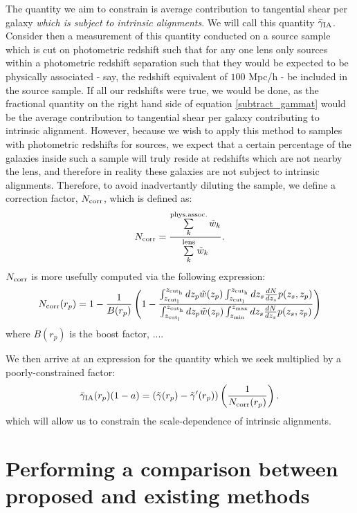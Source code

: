 \documentclass[a4paper,fleqn,usenatbib]{mnras}
\begin{document}
The quantity we aim to constrain is average contribution to tangential shear per galaxy {\it which is subject to intrinsic alignments}. We will call this quantity $\bar{\gamma}_{\rm IA}$. Consider then a measurement of this quantity conducted on a source sample which is cut on photometric redshift such that for any one lens only sources within a photometric redshift separation such that they would be expected to be physically associated - say, the redshift equivalent of $100$ Mpc/h - be included in the source sample. If all our redshifts were true, we would be done, as the fractional quantity on the right hand side of equation \ref{subtract_gammat} would be the average contribution to tangential shear per galaxy contributing to intrinsic alignment. However, because we wish to apply this method to samples with photometric redshifts for sources, we expect that a certain percentage of the galaxies inside such a sample will truly reside at redshifts which are not nearby the lens, and therefore in reality these galaxies are not subject to intrinsic alignments. Therefore, to avoid inadvertantly diluting the sample, we define a correction factor, $N_{\rm corr}$, which is defined as:
\begin{equation}
N_{\rm corr} = \frac{\sum\limits_{k}^{\rm phys. assoc.} \tilde{w}_k}{\sum\limits_{k}^{\rm lens} \tilde{w}_k}.
\label{Ncorr1}
\end{equation}
$N_{\rm corr}$ is more usefully computed via the following expression:
\begin{equation}
N_{\rm corr}(r_p) = 1 - \frac{1}{B(r_p)}\left(1 - \frac{\int_{z_{\rm cut_l}}^{z_{\rm cut_h}} dz_p \tilde{w}(z_p) \int_{z_{\rm cut_l}}^{z_{\rm cut_h}} dz_s\frac{dN}{dz_s} p(z_s, z_p)}{\int_{z_{\rm cut_l}}^{z_{\rm cut_h}} dz_p  \tilde{w}(z_p) \int_{z_{\rm min}}^{z_{\rm max}} dz_s\frac{dN}{dz_s} p(z_s, z_p)} \right)
\label{ncorr_2}
\end{equation}
where $B(r_p)$ is the boost factor, .... 

We then arrive at an expression for the quantity which we seek multiplied by a poorly-constrained factor:
\begin{equation}
\bar{\gamma}_{\rm IA}(r_p)(1-a) = \left(\tilde{\gamma}(r_p) - \tilde{\gamma}^\prime(r_p)\right)\left(\frac{1}{N_{\rm corr}(r_p)}\right).
\label{IAsol1}
\end{equation}
which will allow us to constrain the scale-dependence of intrinsic alignments.




\section{Performing a comparison between proposed and existing methods}
\label{sec:compare}
\end{document}
